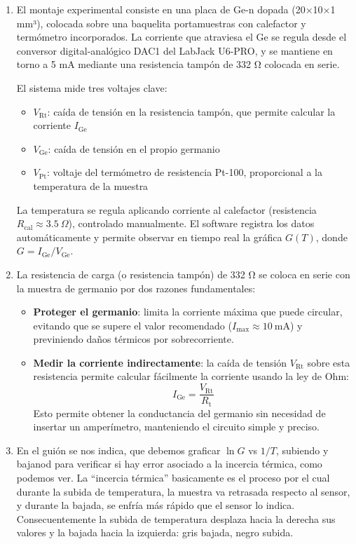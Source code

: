 \begin{enumerate}[label=\alph*)]
    
    \item El montaje experimental consiste en una placa de Ge-n dopada (20×10×1 mm³), colocada sobre una baquelita portamuestras con calefactor y termómetro incorporados. La corriente que atraviesa el Ge se regula desde el conversor digital-analógico DAC1 del LabJack U6-PRO, y se mantiene en torno a 5 mA mediante una resistencia tampón de 332 Ω colocada en serie.

    El sistema mide tres voltajes clave:
    \begin{itemize}
        \item \( V_{\text{Rt}} \): caída de tensión en la resistencia tampón, que permite calcular la corriente \( I_{\text{Ge}} \)
        \item \( V_{\text{Ge}} \): caída de tensión en el propio germanio
        \item \( V_{\text{Pt}} \): voltaje del termómetro de resistencia Pt-100, proporcional a la temperatura de la muestra
    \end{itemize}
    
    La temperatura se regula aplicando corriente al calefactor (resistencia \( R_{\text{cal}} \approx 3.5\ \Omega \)), controlado manualmente. El software registra los datos automáticamente y permite observar en tiempo real la gráfica \( G(T) \), donde \( G = I_{\text{Ge}} / V_{\text{Ge}} \).

    \item La resistencia de carga (o resistencia tampón) de 332 Ω se coloca en serie con la muestra de germanio por dos razones fundamentales:

\begin{itemize}
    \item \textbf{Proteger el germanio}: limita la corriente máxima que puede circular, evitando que se supere el valor recomendado (\( I_{\text{max}} \approx 10\ \text{mA} \)) y previniendo daños térmicos por sobrecorriente.
    \item \textbf{Medir la corriente indirectamente}: la caída de tensión \( V_{\text{Rt}} \) sobre esta resistencia permite calcular fácilmente la corriente usando la ley de Ohm:
    \[
    I_{\text{Ge}} = \frac{V_{\text{Rt}}}{R_{\text{t}}}
    \]
    Esto permite obtener la conductancia del germanio sin necesidad de insertar un amperímetro, manteniendo el circuito simple y preciso.
\end{itemize}

    \item En el guión se nos indica, que debemos graficar $\ln G$ vs $1/T$, subiendo y bajanod para verificar si hay error asociado a la incercia  térmica, como podemos ver. La ``incercia  térmica'' basicamente es el proceso por el cual durante la subida de temperatura, la muestra va retrasada respecto al sensor, y durante la bajada, se enfría más rápido que el sensor lo indica. Consecuentemente la subida de temperatura desplaza hacia la derecha sus valores y la bajada hacia la izquierda: gris bajada, negro subida. 
\end{enumerate}

